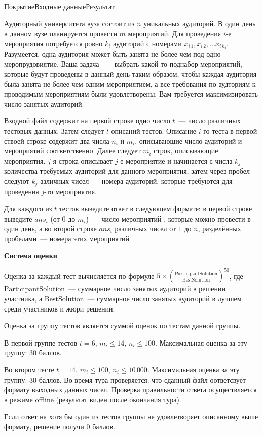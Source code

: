 

\begin{problem}{Покрытие}{Входные данные}{Результат}{}

Аудиторный университета вуза состоит из $n$ уникальных аудиторий. В один день в данном вузе планируется провести $m$ мероприятий. Для проведения $i$-е мероприятия потребуется ровно $k_i$ аудиторий с номерами $x_{i\, 1}, x_{i\, 2}, \ldots x_{i\, k_i}$. Разумеется, одна аудитория может быть занята не более чем под одно меропрудовиятие. Ваша задача ~--- выбрать какой-то поднабор мероприятий, которые будут проведены в данный день таким образом, чтобы каждая аудитория была занята не более чем одним мероприятием, а все требования по аудториям к проводимым мероприятиям были удовлетворены. Вам требуется максимизировать число занятых аудиторий.

\InputFile
Входной файл содержит на первой строке одно число $t$~--- число различных тестовых данных. Затем следует $t$ описаний тестов. Описание $i$-го теста в первой ствоей строке содержит два числа $n_i$ и $m_i$, описывающие число аудиторий и мероприятий соответственно. Далее следует $m_i$ строк, описывающие мероприятия. $j$-я строка описывает $j$-е мероприятие и начинается с числа $k_j$~--- количества требуемых аудиторий для данного мероприятия, затем через пробел следуют $k_j$ азличных чисел~--- номера аудиторий, которые требуются для проведения $j$-то мероприятия.  

\OutputFile
Для каждого из $t$ тестов выведите ответ в следующем формате: в первой строке выведите $ans_i$ (от $0$ до $m_i$)~--- число мероприятий , которые можно провести в один день, а во второй строке $ans_i$ различных чисел от $1$ до $n$, разделённых пробелами~--- номера этих мероприятий


\Examples
\begin{example}
%
\end{example}

{\noindent\bf\problemsectionfont\textsf{Система оценки}}

Оценка за каждый тест вычисляется по формуле $5 \times\left(\frac{\text {ParticipantSolution}}{\text {BestSolution}}\right)^{50}$, где $\text{ParticipantSolution}$~--- суммарное число занятых аудиторий в решении участника, а $\text{BestSolution}$~--- суммарное число занятых аудиторий в лучшем среди участников и жюри решении.

Оценка за группу тестов является суммой оценок по тестам данной группы.

В первой группе тестов $t = 6,\, m_i \leqslant 14,\, n_i \leqslant 100$. Максимальная оценка за эту группу: $30$ баллов. 

Во втором тесте $t = 14,\, m_i \leqslant 100,\, n_i \leqslant 10\,000$. Максимальная оценка за эту группу: $30$ баллов. Во время тура проверяется. что сданный файл оответсвует формату выходных данных чисел. Проверка правильности ответа осуществляется в режиме offline (результат виден после окончания тура).

Если ответ на хотя бы один из тестов группы не удовлетворяет описанному выше формату, решение получи 0 баллов.

\end{problem} 

